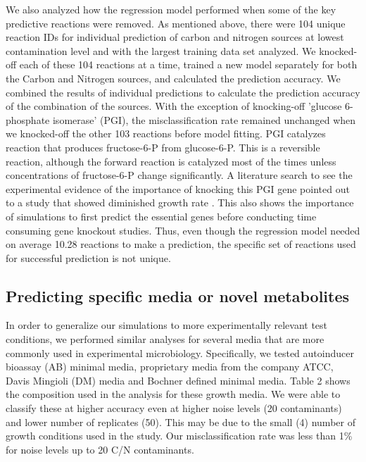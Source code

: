 \documentclass[12pt]{article}
\begin{document}
We also analyzed how the regression model performed when some of the key predictive reactions were removed. As mentioned above, there were 104 unique reaction IDs for individual prediction of carbon and nitrogen sources at lowest contamination level and with the largest training data set analyzed. We knocked-off each of these 104 reactions at a time, trained a new model separately for both the Carbon and Nitrogen sources, and calculated the prediction accuracy. We combined the results of individual predictions to calculate the prediction accuracy of the combination of the sources. With the exception of knocking-off 'glucose 6-phosphate isomerase' (PGI), the misclassification rate remained unchanged when we knocked-off the other 103 reactions before model fitting. PGI catalyzes reaction that produces fructose-6-P from glucose-6-P. This is a reversible reaction, although the forward reaction is catalyzed most of the times unless concentrations of fructose-6-P change significantly. A literature search to see the experimental evidence of the importance of knocking this PGI gene pointed out to a study that showed diminished growth rate \cite{Canonacoetal2001}. This also shows the importance of simulations to first predict the essential genes before conducting time consuming gene knockout studies. Thus, even though the regression model needed on average 10.28 reactions to make a prediction, the specific set of reactions used for successful prediction is not unique.


\subsection*{Predicting specific media or novel metabolites}

In order to generalize our simulations to more experimentally relevant test conditions, we performed similar analyses for several media that are more commonly used in experimental microbiology. Specifically, we tested autoinducer bioassay (AB) minimal media, proprietary media from the company ATCC, Davis Mingioli (DM) media and Bochner defined minimal media. Table 2 shows the composition used in the analysis for these growth media. We were able to classify these at higher accuracy even at higher noise levels (20 contaminants) and lower number of replicates (50). This may be due to the small (4) number of growth conditions used in the study. Our misclassification rate was less than 1\% for noise levels up to 20 C/N contaminants.
\end{document}
